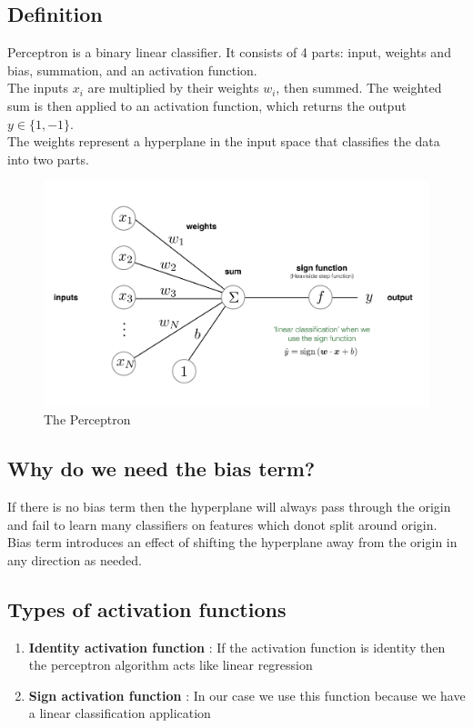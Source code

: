 \documentclass[11pt]{article}
\begin{document}
\subsection{Definition}
Perceptron is a binary linear classifier. It consists of 4 parts: input, weights and bias, summation, and an activation function. \\
The inputs $x_i$ are multiplied by their weights $w_i$, then summed. The weighted sum is then applied to an activation function, which returns the output $y \in \{1, -1\}$.\\
The weights represent a hyperplane in the input space that classifies the data into two parts.
\begin{figure}[H]
  \centering
  \includegraphics[width=1\linewidth]{perceptron_image.png}
\caption{The Perceptron}
\label{fig:test}
\end{figure}

\subsection{Why do we need the bias term?}
If there is no bias term then the hyperplane will always pass through the origin and fail to learn many classifiers on features which donot split around origin. \\
Bias term introduces an effect of shifting the hyperplane away from the origin in any direction as needed.

\subsection{Types of activation functions}
\begin{enumerate}
    \item \textbf{Identity activation function} : If the activation function is identity then the perceptron algorithm acts like linear regression
    \item \textbf{Sign activation function} : In our case we use this function because we have a linear classification application
\end{enumerate}
\end{document}
